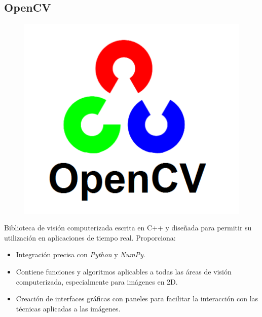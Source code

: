 \subsection{OpenCV}
\begin{figure}[H]
  \hspace*{1.4cm}
  \includegraphics[scale=0.2]{imagenes/logos/opencv_logo.png}
\end{figure}
Biblioteca de visión computerizada escrita en C++ y diseñada para
permitir su utilización en aplicaciones de tiempo real. Proporciona:
\begin{itemize}
\item Integración precisa con \emph{Python} y \emph{NumPy}.
\item Contiene funciones y algoritmos aplicables a todas las áreas de
  visión computerizada, especialmente para imágenes en 2D.
\item Creación de interfaces gráficas con paneles para facilitar la
  interacción con las técnicas aplicadas a las imágenes.
\end{itemize}

